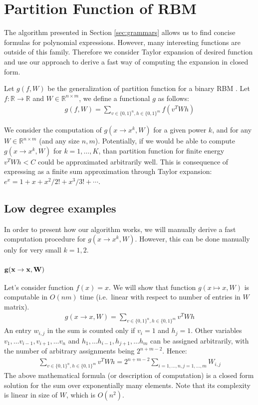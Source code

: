 \section{Partition Function of RBM} \label{partitionfunction}

The algorithm presented in Section
\ref{sec:grammars} allows us to find concise formulas for polynomial expressions.
However, many interesting functions are outside of this
family. Therefore we consider Taylor expansion of desired function
and use our approach to derive a fast way of computing the expansion
in closed form.

Let $g(f, W)$ be the generalization of partition function for a binary
RBM \cite{hinton2002training}. Let $f : \mathbb{R} \rightarrow \mathbb{R}$ and $W \in \mathbb{R}^{n \times m}$,
we define a functional $g$ as follows: \\
\begin{gather*}
g(f, W) = \sum_{v \in \{0, 1\}^n, h \in \{0, 1\}^m} f(v^TWh)
\end{gather*}

We consider the computation of $g(x \rightarrow x^k, W)$ for a given power
$k$, and for any $W
\in \mathbb{R}^{n \times m}$ (and any size $n, m$). Potentially, if we would be able
to compute $g(x \rightarrow x^k, W)$ for $k = 1, \dots, K$, than partition
function for finite energy $v^TWh < C$ could be approximated arbitrarily well.
This is consequence of expressing as a finite sum approximation through
Taylor expansion: $e^{x}=1+x+x^2/2!+x^3/3!+\cdots$.

\subsection{Low degree examples} In order to present how our algorithm works,
we will manually derive a fast computation procedure for $g(x \rightarrow x^k, W)$.
However, this can be done manually only for very small $k = 1, 2$. 


\subsubsection{{$\bf g(x \rightarrow x, W)$}} Let's consider function $f(x) = x$. We
will show that function $g(x \mapsto x, W)$ is computable in $O(nm)$ time
(i.e.~linear with respect to number of entries in $W$ matrix).
\begin{gather*}
	g(x \rightarrow x, W) = \sum_{v \in \{0, 1\}^n, h \in \{0, 1\}^m} v^TWh
\end{gather*}
An entry $w_{i,j}$ in the sum is counted only if $v_i = 1$ and $h_j = 1$. Other variables
$v_1, \dots v_{i-1}, v_{i+1}, \dots v_n$ and $h_1, \dots h_{i-1}, h_{j+1}, \dots h_m$ can be 
assigned arbitrarily, with the number of arbitrary assignments being
$2^{n + m - 2}$. Hence:
\begin{gather*}
	\sum_{v \in \{0, 1\}^n, h \in \{0, 1\}^m} v^TWh = 2^{n + m - 2}\sum_{i = 1, \dots, n, j = 1, \dots, m} W_{i, j}
\end{gather*}
The above mathematical formula (or description of computation) is a
closed form solution for the sum over exponentially many
elements. Note that its complexity is linear in size of $W$, which is $O(n^2)$.

